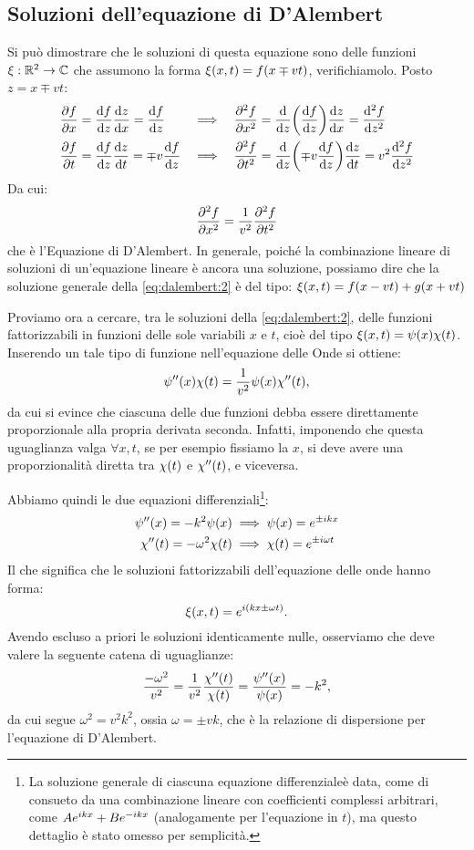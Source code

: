     \subsection{Soluzioni dell'equazione di D'Alembert}
        Si pu\`o dimostrare che le soluzioni di questa equazione sono delle funzioni $\xi:\mathbb{R}^2\rightarrow\mathbb{C}$ che assumono la forma $\xi\qty(x,t)=f\qty(x\mp vt)$, verifichiamolo. Posto $z=x\mp vt$:
        \begin{align*}
            &\pdv{f}{x}=\dv{f}{z}\dv{z}{x}=\dv{f}{z}      &\implies& \quad\pdv[2]{f}{x}=\dv{z}\qty(\dv{f}{z})\dv{z}{x}=\dv[2]{f}{z}\\
            &\pdv{f}{t}=\dv{f}{z}\dv{z}{t}=\mp v\dv{f}{z} &\implies& \quad\pdv[2]{f}{t}=\dv{z}\qty(\mp v\dv{f}{z})\dv{z}{t}=v^2\dv[2]{f}{z}
        \end{align*}
        Da cui:
            $$\pdv[2]{f}{x}=\frac{1}{v^2}\pdv[2]{f}{t}$$
        che \`e l'Equazione di D'Alembert. In generale, poich\'e la combinazione lineare di soluzioni di un'equazione lineare \`e ancora una soluzione, possiamo dire che la soluzione generale della \eqref{eq:dalembert:2} \`e del tipo: $\xi\qty(x,t)=f(x-vt)+g(x+vt)$
        \par Proviamo ora a cercare, tra le soluzioni della \eqref{eq:dalembert:2}, delle funzioni fattorizzabili in funzioni delle sole variabili $x$ e $t$, cio\`e del tipo $\xi\qty(x,t)=\psi\qty(x)\chi\qty(t)$. Inserendo un tale tipo di funzione nell'equazione delle Onde si ottiene:
            $$\psi''\qty(x)\chi\qty(t)=\frac{1}{v^2}\psi\qty(x)\chi''\qty(t),$$
        da cui si evince che ciascuna delle due funzioni debba essere direttamente proporzionale alla propria derivata seconda. Infatti, imponendo che questa uguaglianza valga $\forall x,t$, se per esempio fissiamo la $x$, si deve avere una proporzionalit\`a diretta tra $\chi\qty(t)$ e $\chi''\qty(t)$, e viceversa.
        \par Abbiamo quindi le due equazioni differenziali\footnote{La soluzione generale di ciascuna equazione differenziale\`e data, come di consueto da una combinazione lineare con coefficienti complessi arbitrari, come $Ae^{ikx}+Be^{-ikx}$ (analogamente per l'equazione in $t$), ma questo dettaglio \`e stato omesso per semplicit\`a.}:
        \begin{align*}
            \psi''\qty(x)=-k^2\psi\qty(x)       &\implies \psi\qty(x)=e^{\pm ikx}\\
            \chi''\qty(t)=-\omega^2\chi\qty(t)  &\implies \chi\qty(t)=e^{\pm i\omega t}
        \end{align*}
        Il che significa che le soluzioni fattorizzabili dell'equazione delle onde hanno forma:
        \begin{equation}
            \xi\qty(x,t)=e^{i\qty(kx\pm\omega t)}.
        \end{equation}
        Avendo escluso a priori le soluzioni identicamente nulle, osserviamo che deve valere la seguente catena di uguaglianze:
            $$\frac{-\omega^2}{v^2}=\frac{1}{v^2}\frac{\chi''\qty(t)}{\chi\qty(t)}=\frac{\psi''\qty(x)}{\psi\qty(x)}=-k^2,$$
        da cui segue $\omega^2=v^2k^2$, ossia $\omega=\pm vk$, che \`e la relazione di dispersione per l'equazione di D'Alembert.
